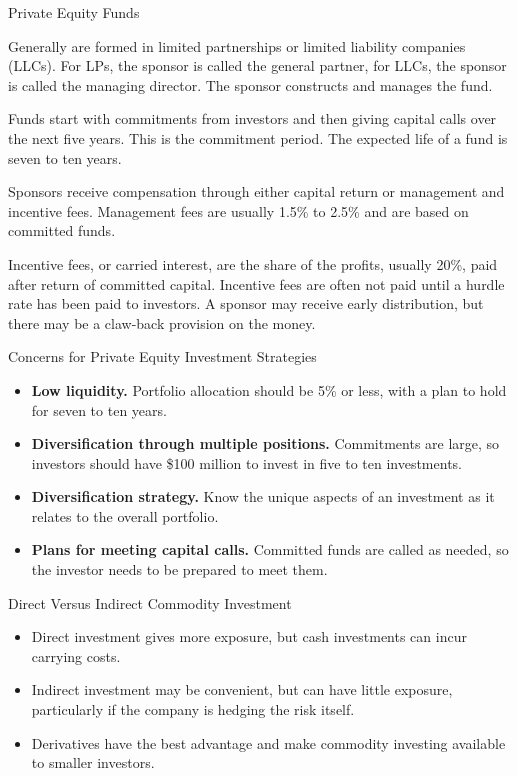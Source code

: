 \documentclass[../custom,grid]{flashcards}
\begin{document}
\begin{flashcard}{Private Equity Funds}
    \begin{flushleft}
        Generally are formed in limited partnerships or limited liability companies (LLCs). For LPs, the sponsor is called the general partner, for LLCs, the sponsor is called the managing director. The sponsor constructs and manages the fund.\newline

        Funds start with commitments from investors and then giving capital calls over the next five years. This is the commitment period. The expected life of a fund is seven to ten years.\newline

        Sponsors receive compensation through either capital return or management and incentive fees. Management fees are usually 1.5\% to 2.5\% and are based on committed funds.\newline

        Incentive fees, or carried interest, are the share of the profits, usually 20\%, paid after return of committed capital. Incentive fees are often not paid until a hurdle rate has been paid to investors. A sponsor may receive early distribution, but there may be a claw-back provision on the money.
    \end{flushleft}
\end{flashcard}

\begin{flashcard}{Concerns for Private Equity Investment Strategies}
    \begin{itemize}
        \item \textbf{Low liquidity.} Portfolio allocation should be 5\% or less, with a plan to hold for seven to ten years.
        \item \textbf{Diversification through multiple positions.} Commitments are large, so investors should have \$100 million to invest in five to ten investments.
        \item \textbf{Diversification strategy.} Know the unique aspects of an investment as it relates to the overall portfolio.
        \item \textbf{Plans for meeting capital calls.} Committed funds are called as needed, so the investor needs to be prepared to meet them.
    \end{itemize}
\end{flashcard}

\begin{flashcard}{Direct Versus Indirect Commodity Investment}
    \begin{itemize}
        \item Direct investment gives more exposure, but cash investments can incur carrying costs.
        \item Indirect investment may be convenient, but can have little exposure, particularly if the company is hedging the risk itself.
        \item Derivatives have the best advantage and make commodity investing available to smaller investors.
    \end{itemize}
\end{flashcard}
\end{document}

